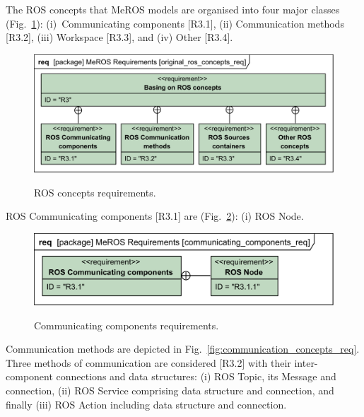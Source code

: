 \documentclass[11pt,oneside,a4paper]{report}
\begin{document}
	The ROS concepts that MeROS models are organised into four major classes (Fig.~\ref{fig:ros_concepts_req}): (i)~Communicating components [R3.1], (ii) Communication methods [R3.2], (iii) Workspace [R3.3], and (iv) Other [R3.4].
	

	\begin{figure}[H]
		\centering
		\begin{center}
			{\includegraphics[scale=1.0]{diagrams/original_ros_concepts_req.png}}
		\end{center}
		\caption{ROS concepts requirements.} 
		\label{fig:ros_concepts_req}
	\end{figure}

	\pagebreak
	
	ROS Communicating components [R3.1] are (Fig.~\ref{fig:communicating_components_req}): (i) ROS Node.

	\begin{figure}[H]
		\centering
		\begin{center}
			{\includegraphics[scale=1.1]{diagrams/communicating_components_req.png}}
		\end{center}
		\caption{Communicating components requirements.} 
		\label{fig:communicating_components_req}
	\end{figure}
	
	Communication methods are depicted in Fig.~\ref{fig:communication_concepts_req}.
	 Three methods of communication are considered [R3.2] with their inter-component connections and data structures: (i) ROS Topic, its Message and connection, (ii) ROS Service comprising data structure and connection, and finally (iii) ROS Action including data structure and connection.
	
\end{document}
